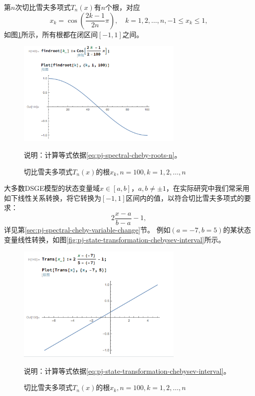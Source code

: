 第$n$次切比雪夫多项式$T_n(x)$有$n$个根，对应
\begin{equation}
  \label{eq:pj-spectral-cheby-roots-n}
  x_k = \cos \left( \frac{2k - 1}{2n} \pi \right), \quad k = 1, 2, \ldots, n, -1 \le x_k \le 1,
\end{equation}
如图\ref{fig:pj-spectral-cheby-roots-n}所示，所有根都在闭区间$[-1,1]$之间。
\begin{figure}[htbp]
   \caption[切比雪夫多项式的根]{切比雪夫多项式$T_n(x)$的根$x_k, n=100, k=1,2,\ldots,n$}
  \centering
  \includegraphics[width=8cm]{./Figures/20170917-cheb-roots-n-range}
  \label{fig:pj-spectral-cheby-roots-n}

  \small{说明：计算等式依据\eqref{eq:pj-spectral-cheby-roots-n}。}
\end{figure}

大多数DSGE模型的状态变量域$x \in [a,b]$，$a,b \neq \pm 1$，在实际研究中我们常采用如下线性关系转换，将它转换为$[-1,1]$区间内的值，以符合切比雪夫多项式的要求：
\begin{equation}
  \label{eq:pj-state-transformation-chebysev-interval}
  2 \frac{x-a}{b-a} -1,
\end{equation}
详见第\ref{sec:pj-spectral-cheby-variable-change}节。
例如$(a=-7,b=5)$的某状态变量线性转换，如图\eqref{fig:pj-state-transformation-chebysev-interval}所示。
\begin{figure}[htbp]
   \caption[切比雪夫多项式的根]{切比雪夫多项式$T_n(x)$的根$x_k, n=100, k=1,2,\ldots,n$}
  \centering
  \includegraphics[width=8cm]{./Figures/20170917-linear-trans-state-chebyshev}
  \label{fig:pj-state-transformation-chebysev-interval}

  \small{说明：计算等式依据\eqref{eq:pj-state-transformation-chebysev-interval}。}
\end{figure}


